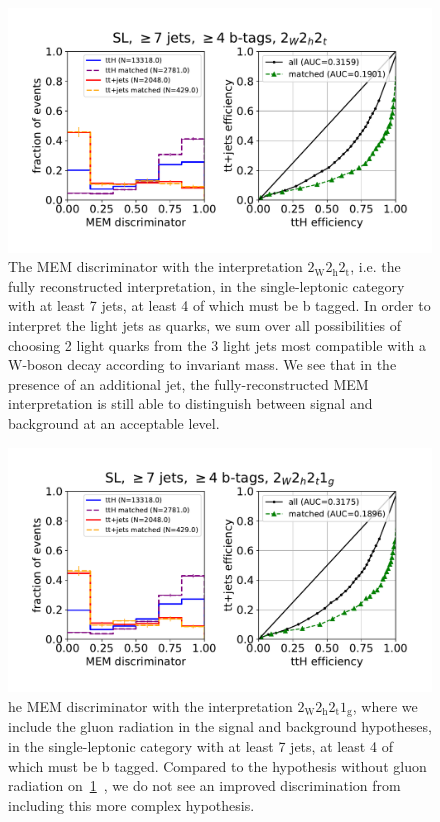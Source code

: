 \begin{figure}
\begin{centering}
\includegraphics[width = 1.0\textwidth]{figures/mem_sl_jge7_tge4.pdf}
\caption{The MEM discriminator with the interpretation $2_{\mathrm{W}} 2_{\mathrm{h}} 2_{\mathrm{t}}$, i.e. the fully reconstructed interpretation, in the single-leptonic category with at least 7 jets, at least 4 of which must be b tagged. In order to interpret the light jets as quarks, we sum over all possibilities of choosing 2 light quarks from the 3 light jets most compatible with a $\mathrm{W}$-boson decay according to invariant mass. We see that in the presence of an additional jet, the fully-reconstructed MEM interpretation is still able to distinguish between signal and background at an acceptable level.}
\label{fig:mem_sl_jge7_tge4}
\end{centering}
\end{figure}

\begin{figure}
\begin{centering}
\includegraphics[width = 1.0\textwidth]{figures/mem_sl_jge7_tge4_1g.pdf}
\caption{he MEM discriminator with the interpretation $2_{\mathrm{W}} 2_{\mathrm{h}} 2_{\mathrm{t}} 1_{\mathrm{g}}$, where we include the gluon radiation in the signal and background hypotheses, in the single-leptonic category with at least 7 jets, at least 4 of which must be b tagged. Compared to the hypothesis without gluon radiation on~\cref{fig:mem_sl_jge7_tge4}~, we do not see an improved discrimination from including this more complex hypothesis.}
\label{fig:mem_sl_jge7_tge4_7jet}
\end{centering}
\end{figure}